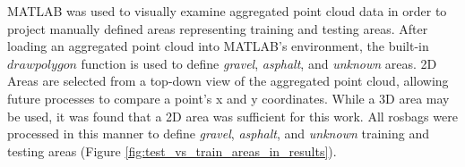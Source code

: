 \documentclass[numbered,pdftex]{ohio-etd}
\begin{document}
{{		{MATLAB was used to visually examine aggregated point cloud data in order to project manually defined areas representing training and testing areas. After loading an aggregated point cloud into MATLAB's environment, the built-in $drawpolygon$ function is used to define \textit{gravel}, \textit{asphalt}, and \textit{unknown} areas. 2D Areas are selected from a top-down view of the aggregated point cloud, allowing future processes to compare a point's x and y coordinates. While a 3D area may be used, it was found that a 2D area was sufficient for this work. All rosbags were processed in this manner to define \textit{gravel}, \textit{asphalt}, and \textit{unknown} training and testing areas (Figure \ref{fig:test_vs_train_areas_in_results}).}
		
		
}}
\end{document}
